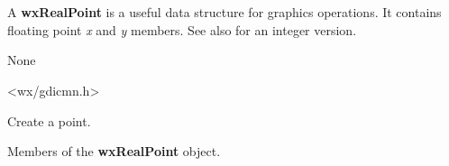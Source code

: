 \section{}\label{wxrealpoint}

A {\bf wxRealPoint} is a useful data structure for graphics operations.
It contains floating point {\it x} and {\it y} members.
See also  for an integer version.


None


<wx/gdicmn.h>






\label{wxrealpointctor}



Create a point.



Members of the {\bf wxRealPoint} object.


